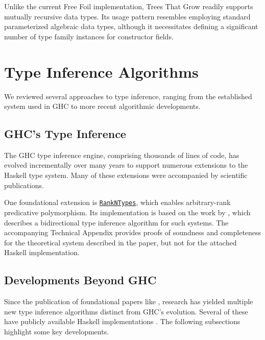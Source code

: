 Unlike the current Free Foil implementation, Trees That Grow readily supports mutually recursive data types. Its usage pattern resembles employing standard parameterized algebraic data types, although it necessitates defining a significant number of type family instances for constructor fields.

\section{Type Inference Algorithms}
\label{sec:TypeInferenceAlgorithm}

We reviewed several approaches to type inference, ranging from the established system used in GHC to more recent algorithmic developments.

\subsection{GHC's Type Inference}

The GHC type inference engine, comprising thousands of lines of code, has evolved incrementally over many years to support numerous extensions to the Haskell type system. Many of these extensions were accompanied by scientific publications.

One foundational extension is \href{https://gitlab.haskell.org/haskell/prime/-/wikis/RankNTypes}{\texttt{RankNTypes}}, which enables arbitrary-rank predicative polymorphism. Its implementation is based on the work by \cite{jones-practical-2007}, which describes a bidirectional type inference algorithm for such systems. The accompanying Technical Appendix \cite{practical-type-inference-proofs} provides proofs of soundness and completeness for the theoretical system described in the paper, but not for the attached Haskell implementation.

\subsection{Developments Beyond GHC}

Since the publication of foundational papers like \cite{jones-practical-2007}, research has yielded multiple new type inference algorithms distinct from GHC's evolution. Several of these have publicly available Haskell implementations \cite{github-goldenberg-artem-goldenbergbidirectionalsystem-2025, github-choi-kwanghoonbidi-2025, github-chen-cu1ch3ntype-inference-zoo-2025}. The following subsections highlight some key developments.

